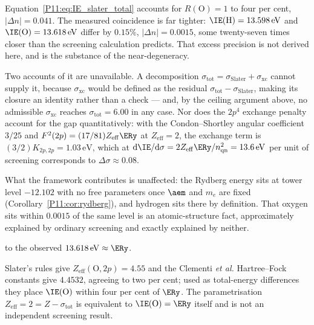 \begin{remark}
\label{P11:rem:sigma_xc_origin}
Equation~\eqref{P11:eq:IE_slater_total} accounts for
$R(\mathrm{O})=1$ to four per cent, $|\Delta n| = 0.041$.  The measured
coincidence is far tighter: $\IE(\mathrm{H})=13.598\,\mathrm{eV}$ and
$\IE(\mathrm{O})=13.618\,\mathrm{eV}$ differ by $0.15\%$,
$|\Delta n| = 0.0015$, some twenty-seven times closer than the
screening calculation predicts.  That excess precision is not derived
here, and is the substance of the near-degeneracy.

Two accounts of it are unavailable.  A decomposition
$\sigma_\mathrm{tot} = \sigma_\mathrm{Slater} + \sigma_\mathrm{xc}$
cannot supply it, because $\sigma_\mathrm{xc}$ would be defined as the
residual $\sigma_\mathrm{tot}-\sigma_\mathrm{Slater}$, making its
closure an identity rather than a check --- and, by the ceiling
argument above, no admissible $\sigma_\mathrm{xc}$ reaches
$\sigma_\mathrm{tot}=6.00$ in any case.  Nor does the $2p^4$ exchange
penalty account for the gap quantitatively: with the Condon--Shortley
angular coefficient $3/25$ and $F^2(2p)=(17/81)Z_\mathrm{eff}\ERy$ at
$Z_\mathrm{eff}=2$, the exchange term is
$(3/2)K_{2p,2p} = 1.03\,\mathrm{eV}$, which at
$\mathrm{d}\IE/\mathrm{d}\sigma = 2Z_\mathrm{eff}\ERy/n_\mathrm{qn}^2
= 13.6\,\mathrm{eV}$ per unit of screening corresponds to
$\Delta\sigma \approx 0.08$.

What the framework contributes is unaffected: the Rydberg energy sits
at tower level $-12.102$ with no free parameters once $\aem$ and $m_e$
are fixed (Corollary~\ref{P11:cor:rydberg}), and hydrogen sits there by
definition.  That oxygen sits within $0.0015$ of the same level is an
atomic-structure fact, approximately explained by ordinary screening
and exactly explained by neither.
\end{remark}


to the observed $13.618\,\mathrm{eV} \approx \ERy$.


  Slater's rules give $Z_\mathrm{eff}(\mathrm{O},2p)=4.55$ and the
  Clementi \emph{et al.} Hartree--Fock constants give $4.4532$,
  agreeing to two per cent; used as total-energy differences they
  place $\IE(\mathrm{O})$ within four per cent of $\ERy$.  The
  parametrisation $Z_\mathrm{eff}=2=Z-\sigma_\mathrm{tot}$ is
  equivalent to $\IE(\mathrm{O})=\ERy$ itself and is not an
  independent screening result.
